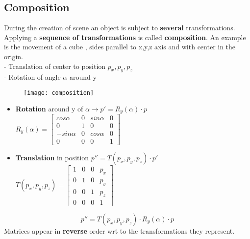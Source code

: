 \subsection{Composition}
During the creation of scene an object is subject to \textbf{several} transformations. Applying a \textbf{sequence of transformations} is called \textbf{composition}.
An example is the movement of a cube , sides parallel to x,y,z axis and with center in the origin.\\
- Translation of center to position $p_x,p_y,p_z$\\
- Rotation of angle $\alpha$ around y\\
\begin{figure}[H]
  \centering
  \texttt{[image: composition]}
\end{figure}
\begin{itemize}
\item \textbf{Rotation} around y of $\alpha \to p'=R_y(\alpha) \cdot p$\\
$	
R_y(\alpha)= \begin{bmatrix}
       cos\alpha & 0 & sin\alpha & 0        \\[0.1em]
       0 & 1 & 0 & 0		    \\[0.1em]
       -sin\alpha & 0 & cos\alpha & 0							\\[0.1em]
       0 & 0 & 0 & 1
     \end{bmatrix} 
$ 
\item \textbf{Translation} in position $p''=T(p_x,p_y,p_z) \cdot p'$\\
$	
T(p_x,p_y,p_z)= \begin{bmatrix}
       1 & 0 & 0 & p_x        \\[0.1em]
       0 & 1 & 0 & p_y	    \\[0.1em]
       0 & 0 & 1 & p_z							\\[0.1em]
       0 & 0 & 0 & 1
     \end{bmatrix} 
$
\end{itemize}
\[
\boxed{p''= T(p_x,p_y,p_z) \cdot R_y(\alpha) \cdot p}
\]
Matrices appear in \textbf{reverse} order wrt to the transformations they represent.

